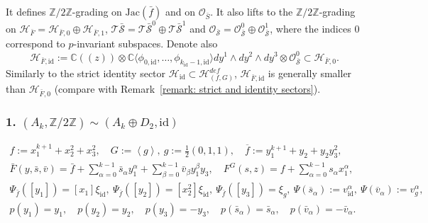 \documentclass[reqno,12pt]{amsart}
\numberwithin{equation}{section}
\theoremstyle{plain}
\theoremstyle{definition}
\newcommand{\CC}{{\mathbb{C}}}
\newcommand{\ZZ}{{\mathbb{Z}}}
\newcommand{\Jac}{\mathrm{Jac}}
\newcommand{\id}{\mathrm{id}}
\def\H{{\mathcal H}}
\def\O{{\mathcal O}}
\def\T{{\mathcal T}}
\numberwithin{equation}{section}
\begin{document}
It defines $\ZZ/2\ZZ$-grading on $\Jac(\bar{f})$ and on $\O_{\bar{S}}$. It also lifts to the  $\ZZ/2\ZZ$-grading on $\H_{\bar{F}} = \H_{\bar{F}, 0} \oplus \H_{\bar{F},1}$, $\T \mathcal{\bar{S}} = \T \mathcal{\bar{S}}^{0} \oplus \T \mathcal{\bar{S}}^1$ and $\O_{\mathcal{\bar{S}}} = \O_{\mathcal{\bar{S}}}^{0} \oplus \O_{\mathcal{\bar{S}}}^{1}$, where the indices $0$ correspond to $p$-invariant subspaces. 
Denote also
\[
\H_{\bar{F},\id} := \CC((z)) \otimes \CC \langle \phi_{0,\id},\dots, \phi_{k_\id-1,\id} \rangle dy^1\wedge dy^2 \wedge dy^3  \otimes \O_{\mathcal{\bar{S}}}^{0} \subset \H_{\bar{F},0}.
\]
Similarly to the strict identity sector $\H_{\id} \subset \H^{def}_{(f,G)}$, $\H_{\bar{F},\id}$ is generally smaller than $\H_{\bar{F},0}$ (compare with Remark~\ref{remark: strict and identity sectors}).


\subsubsection*{\textbf{1.} $(A_k, \ZZ/2\ZZ) \sim (A_{k}\oplus D_2, \id)$ }
\begin{gather*}
    f :=x_1^{k+1}+x_2^2+x_3^2,\quad G:=\left<g\right>,\ g:=\frac{1}{2}(0,1,1), \quad \overline{f}:=y_1^{k+1}+y_2+y_2y_3^2,
    \\
    \bar{F} (y, \bar{s}, \bar{v}) = \bar{f} + \sum_{\alpha=0}^{k-1}\bar{s}_\alpha y_1^\alpha +  \sum_{\beta=0}^{k-1} \bar{v}_\beta y_1^\beta y_3, \quad F^G(s,z) = f + \sum_{\alpha=0}^{k-1} s_\alpha x_1^{\alpha},    
    \\
    \Psi_{\bar{f}}([y_1]) = [x_1]\xi_{\id}, \ \Psi_{\bar{f}}([y_2]) = [x_2^2]\xi_{\id}, \ \Psi_{\bar{f}}([y_3]) = \xi_{g}, \
    \Psi (\overline s_\alpha) := v_\id^{\alpha}, \ \Psi (\overline v_\alpha) := v_g^{\alpha},
    \\
    p(y_1) = y_1,\quad p(y_2) = y_2, \quad p(y_3) = -y_3, \quad p(\bar{s}_\alpha) = \bar{s}_\alpha, \quad p(\bar{v}_\alpha) = - \bar{v}_\alpha.
\end{gather*}
\end{document}
